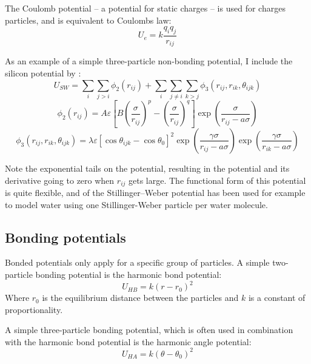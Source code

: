 The Coulomb potential -- a potential for static charges -- is used for charges particles, and is equivalent to Coulombs law:
\begin{equation}
	U_e = k\frac{q_iq_j}{r_{ij}}
\end{equation}

As an example of a simple three-particle non-bonding potential, I include the silicon potential by \citet{Stillinger1985}:
\begin{equation}
	U_{SW} = \sum_i \sum_{j>i} \phi_2(r_{ij}) + \sum_i \sum_{j\neq i} \sum_{k>j} \phi_3(r_{ij}, r_{ik}, \theta_{ijk})
\end{equation}
\begin{equation}
	\phi_2(r_{ij}) = A\varepsilon\left[ B \left( \frac{\sigma}{r_{ij}}\right)^p-\left(\frac{\sigma}{r_{ij}}\right)^q\right]\exp\left(\frac{\sigma}{r_{ij}-a\sigma}\right)
\end{equation}
\begin{equation}
	\phi_3(r_{ij}, r_{ik}, \theta_{ijk}) = \lambda\varepsilon\left[ \cos{\theta_{ijk}} - \cos{\theta_0}\right]^2 \exp\left( \frac{\gamma\sigma}{r_{ij}-a\sigma}\right) \exp\left(\frac{\gamma \sigma}{r_{ik}-a\sigma} \right)
\end{equation}

Note the exponential tails on the potential, resulting in the potential and its derivative going to zero when $r_{ij}$ gets large. The functional form of this potential is quite flexible, and of the Stillinger–Weber potential has been used for example to model water using one Stillinger-Weber particle per water molecule. 

\subsection{Bonding potentials}
Bonded potentials only apply for a specific group of particles. A simple two-particle bonding potential is the harmonic bond potential:
\begin{equation}
	U_{HB} = k(r - r_0)^2
\end{equation}
Where $r_0$ is the equilibrium distance between the particles and $k$ is a constant of proportionality.

A simple three-particle bonding potential, which is often used in combination with the harmonic bond potential is the harmonic angle potential:
\begin{equation}
	U_{HA} = k(\theta - \theta_0)^2
\end{equation}

